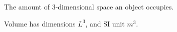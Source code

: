 The amount of 3-dimensional space an object occupies.
\par
Volume has dimensions $L^3$, and SI unit $m^3$.